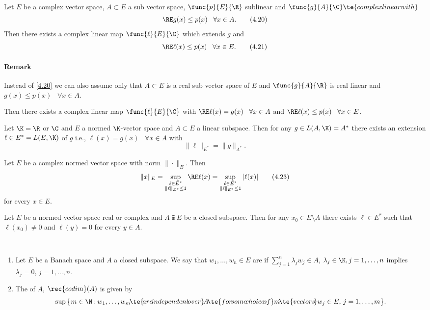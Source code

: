 \begin{thm}\label{iv.5}
    Let $E$ be a complex vector space, $A\subset E$ a sub vector space, $\func{p}{E}{\R}$ sublinear and $\func{g}{A}{\C}\te{ complex linear with}$
    \[\RE g(x)\leq p(x)\;\;\;\forall x\in A. \tag{4.20}\label{4.20}\]
    Then there exists a complex linear map $\func{\ell}{E}{\C}$ which extends $g$ and 
    \[\RE\ell(x)\leq p(x)\;\;\;\forall x\in E.\tag{4.21}\label{4.21}\]
\end{thm}

\paragraph{Remark}
Instead of \eqref{4.20} we can also assume only that $A\subset E$ is a real sub vector space of $E$ and $\func{g}{A}{\R}$ is real linear and $g(x)\leq p(x)\;\;\;\forall x\in A$. 

Then there exists a complex linear map $\func{\ell}{E}{\C}$ with $\RE\ell(x)=g(x)\;\;\;\forall x\in A$ and $\RE\ell(x)\leq p(x)\;\;\;\forall x\in E$.

\begin{cor}\label{iv.6}
    Let $\K=\R$ or $\C$ and $E$ a normed $\K$-vector space and $A\subset E$ a linear subspace. Then for any $g\in L(A,\K)=A^*$ there exists an extension $\ell\in E^*=L(E,\K)$ of $g$ \rec{(}i.e., $\ell(x)=g(x)\;\;\;\forall x\in A$\rec{)} with
    \[\|\ell\|_{E^*}=\|g\|_{A^*}.\tag{4.22}\label{4.22}\]
\end{cor}

\begin{cor}\label{iv.7}
    Let $E$ be a complex normed vector space with norm $\|\cdot\|_E$. Then
    \[\|x\|_E=\sup_{\substack{\ell\in E^*\\\|\ell\|_{E^*}\leq1}}\RE\ell(x)=\sup_{\substack{\ell\in E^*\\\|\ell\|_{E^*}\leq1}}|\ell(x)|\tag{4.23}\label{4.23}\]
    for every $x\in E$.
\end{cor}

\begin{cor}\label{iv.8}
    Let $E$ be a normed vector space \rec{(}real or complex\rec{)} and $A\subsetneqq E$ be a closed subspace. Then for any $x_0\in E\setminus A$ there exists $\ell\in E^*$ such that $\ell(x_0)\neq0$ and $\ell(y)=0$ for every $y\in A$.
\end{cor}

\begin{definition}\label{iv.9}\ 
    \begin{enumerate}[label=\alph*)]
        \item Let $E$ be a Banach space and $A$ a closed subspace. We say that $w_1,\ldots,w_n\in E$ are  if $\sum_{j=1}^n\lambda_jw_j\in A$, $\lambda_j\in\K,j=1,\ldots,n$ implies $\lambda_j=0$, $j=1,\ldots,n$.\label{iv.9.a}
        \item The \bol{codimension} of $A$, $\rec{codim}(A)$ is given by
        \[\sup\big\{m\in \N\colon w_1,\ldots,w_m\!\te{\! are\! independent\! over }\!A\!\te{ for\! some\! choice\! of }m\!\te{ vectors\! }w_j\in E,\,j=1,\ldots,m\big\}.\]
    \end{enumerate}
\end{definition}

